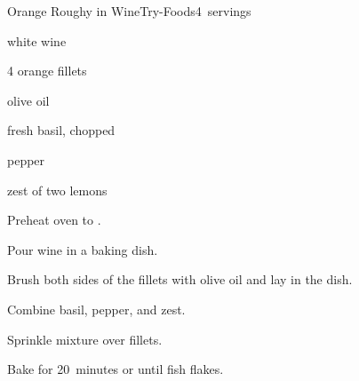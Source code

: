 \begin{recipe}{Orange Roughy in Wine}{Try-Foods}{4~servings}

\begin{ingredients}
\item \C{\quarter} white wine
\item 4  orange  fillets
\item {} olive oil
\item {} fresh basil, chopped
\item {} pepper
\item zest of two lemons
\end{ingredients}

\begin{directions}
\item Preheat oven to .
\item Pour wine in a baking dish.
\item Brush both sides of the fillets with olive oil and lay in the dish.
\item Combine basil, pepper, and zest.
\item Sprinkle mixture over fillets.
\item Bake for 20~minutes or until fish flakes.
\end{directions}

\end{recipe}
